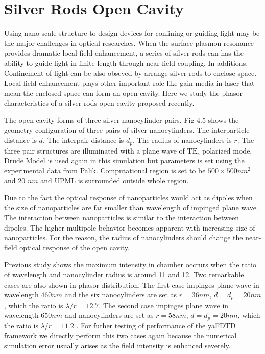 \section{Silver Rods Open Cavity}
Using nano-scale structure to design devices for confining or guiding light may be the major challenges in optical
researches. When the surface plasmon resonance provides dramatic local-field enhancement, a series of silver rods can
has the ability to guide light in finite length through near-field coupling. In additions, Confinement of light can be
also obseved by arrange silver rods to enclose space. Local-field enhancement plays other important role like gain media
in laser that mean the enclosed space can form an open cavity. Here we study the phasor characteristics of a silver rods
open cavity proposed recently.

The open cavity forms of three silver nanocylinder pairs. Fig 4.5 shows the geometry configuration of three pairs of
silver nanocylinders. The interparticle distance is $d$. The interpair distance is $d_p$. The radius of nanocylinders is
$r$. The three pair structures are illuminated with a plane wave of $\mathrm{TE_z}$ polarized mode. Drude Model is used
again in this simulation but parameters is set using the experimental data from Palik. Computational region is set to be
$500 \times 500 nm^2$ and 20 $nm$ and UPML is surrounded outside whole region.

Due to the fact the optical response of nanoparticles would act as dipoles when the size of nanoparticles are far
smaller than wavelength of impinged plane wave. The interaction between nanoparticles is similar to the interaction
between dipoles. The higher multipole behavior becomes apparent with increasing size of nanoparticles. For the reason,
the radius of nanocylinders should change the near-field optical response of the open cavity.

Previous study shows the maximum intensity in chamber occrurs when the ratio of wavelength and nanocylinder radius is
around 11 and 12. Two remarkable cases are also shown in phasor distribution. The first case impinges plane wave in
wavelength $460 nm$ and the six nanocylinders are set as $r = 36 nm$, $d = d_p = 20 nm$, which the ratio is $\lambda /r
= 12.7$. The second case impinges plane wave in wavelength $650 nm$ and nanocylinders are set as $r = 58 nm$, $d = d_p =
20 nm$, which the ratio is $\lambda /r = 11.2$ . For futher testing of performance of the yaFDTD framework we directly
perform this two cases again because the numerical simulation error usually arises as the field intensity is enhanced
severely.

